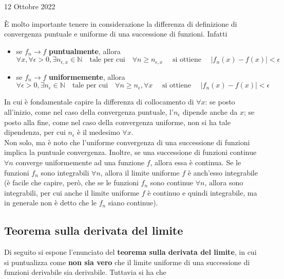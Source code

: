 \documentclass[a4paper]{extarticle}
\begin{document}
\newpage
\noindent
\begin{center}
    12 Ottobre 2022
\end{center}
È molto importante tenere in considerazione la differenza di definizione di convergenza puntuale e uniforme di una successione di funzioni. Infatti
\begin{itemize}
    \item se $f_n \to f$ \textbf{puntualmente}, allora
    \[\forall x, \forall \epsilon > 0, \exists n_{\epsilon,x} \in \mathbb{N} \hspace{1em} \text{tale per cui} \hspace{1em} \forall n \geq n_{\epsilon,x} \hspace{1em}\text{ si ottiene } \hspace{1em} \left \vert f_n(x) - f(x) \right \vert < \epsilon\]

    \item se $f_n \to f$ \textbf{uniformemente}, allora
    \[\forall \epsilon > 0, \exists n_\epsilon \in \mathbb{N} \hspace{1em} \text{tale per cui} \hspace{1em} \forall n \geq n_\epsilon, \forall x \hspace{1em} \text{ si ottiene } \hspace{1em} \left \vert f_n(x) - f(x) \right \vert < \epsilon\]
\end{itemize}
In cui è fondamentale capire la differenza di collocamento di $\forall x$: se posto all'inizio, come nel caso della convergenza puntuale, l'$n_\epsilon$ dipende anche da $x$; se posto alla fine, come nel caso della convergenza uniforme, non si ha tale dipendenza, per cui $n_\epsilon$ è il medesimo $\forall x$.\\
Non solo, ma è noto che l'uniforme convergenza di una successione di funzioni implica la puntuale convergenza. Inoltre, se una successione di funzioni continue $\forall n$ converge uniformemente ad una funzione $f$, allora essa è continua. Se le funzioni $f_n$ sono integrabili $\forall n$, allora il limite uniforme $f$ è anch'esso integrabile (è facile che capire, però, che se le funzioni $f_n$ sono continue $\forall n$, allora sono integrabili, per cui anche il limite uniforme $f$ è continuo e quindi integrabile, ma in generale non è detto che le $f_n$ siano continue).

\vspace{1em}
\subsection{Teorema sulla derivata del limite}
Di seguito si espone l'enunciato del \textbf{teorema sulla derivata del limite}, in cui si puntualizza come \textbf{non sia vero} che il limite uniforme di una successione di funzioni derivabile sia derivabile. Tuttavia si ha che
\end{document}
